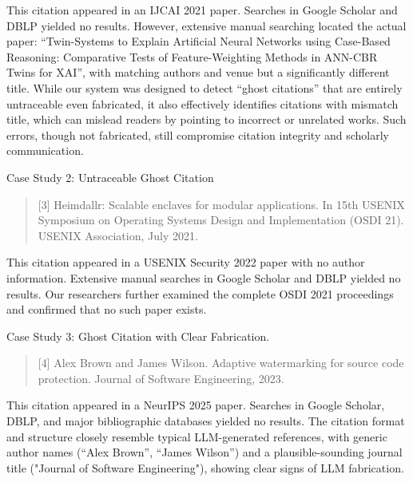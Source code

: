 This citation appeared in an IJCAI 2021 paper. Searches in Google Scholar and DBLP yielded no results. However, extensive manual searching located the actual paper: ``Twin-Systems to Explain Artificial Neural Networks using Case-Based Reasoning: Comparative Tests of Feature-Weighting Methods in ANN-CBR Twins for XAI'', with matching authors and venue but a significantly different title.
While our system was designed to detect ``ghost citations'' that are entirely untraceable even fabricated, it also effectively identifies citations with mismatch title, which can mislead readers by pointing to incorrect or unrelated works. Such errors, though not fabricated, still compromise citation integrity and scholarly communication.

\begin{casestudybox}{Case Study 2: Untraceable Ghost Citation}
\begin{quote}
     \small
    [3] Heimdallr: Scalable enclaves for modular applications. In 15th USENIX Symposium on Operating Systems Design and Implementation (OSDI 21). USENIX Association, July 2021.
\end{quote}
\end{casestudybox}

This citation appeared in a USENIX Security 2022 paper with no author information. Extensive manual searches in Google Scholar and DBLP yielded no results. Our researchers further examined the complete OSDI 2021 proceedings and confirmed that no such paper exists.

\begin{casestudybox}{Case Study 3: Ghost Citation with Clear Fabrication.}
\begin{quote}
    \small
    [4] Alex Brown and James Wilson. Adaptive watermarking for source code protection. Journal of Software Engineering, 2023.
\end{quote}
\end{casestudybox}
This citation appeared in a NeurIPS 2025 paper. Searches in Google Scholar, DBLP, and major bibliographic databases yielded no results. The citation format and structure closely resemble typical LLM-generated references, with generic author names (``Alex Brown'', ``James Wilson'') and a plausible-sounding journal title ("Journal of Software Engineering"), showing clear signs of LLM fabrication.

